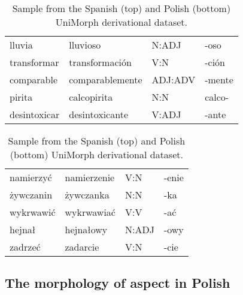 \documentclass[12pt]{article}
\begin{document}
\begin{table}[htbp]
    \small
    \centering
    \begin{tabular}{p{2.5cm}p{3cm}p{2.5cm}p{2.5cm}}
        \toprule
        lluvia   &      lluvioso   &  N:ADJ &   -oso \\
        transformar &  transformación &     V:N &   -ción\\
        comparable & comparablemente & ADJ:ADV &  -mente\\
        pirita &     calcopirita &     N:N &  calco-\\
        desintoxicar &  desintoxicante &   V:ADJ &   -ante\\
    \end{tabular}
    \begin{tabular}{p{2.5cm}p{3cm}p{2.5cm}p{2.5cm}}
        \midrule
        namierzyć  &     namierzenie     &  V:N &   -enie \\ 
        żywczanin  &       żywczanka     &  N:N &     -ka\\ 
        wykrwawić  &      wykrwawiać     &  V:V &     -ać\\ 
        hejnał     &   hejnałowy   &  N:ADJ   &   -owy\\ 
        zadrzeć    &     zadarcie     &  V:N   &  -cie\\ 
        \bottomrule
    \end{tabular}
    \caption{Sample from the Spanish (top) and Polish (bottom) UniMorph derivational dataset.}
    \label{tbl:unimorph-der}
\end{table}


\subsection{The morphology of aspect in Polish}
\end{document}
